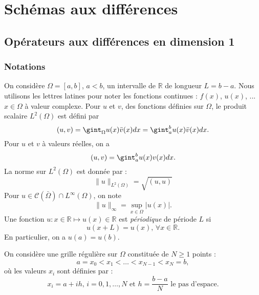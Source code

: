 \chapter{Schémas aux différences}

\section{Opérateurs aux différences en dimension 1}

\subsection{Notations}
\label{sec:notation_1D}

On considère $\Omega = [a,b]$, $a<b$, un intervalle de $\mathbb{R}$ de longueur $L=b-a$. Nous utilisons les lettres latines pour noter les fonctions continues : $f(x)$, $u(x)$, ... $x \in \Omega$ à valeur complexe. Pour $u$ et $v$, des fonctions définies sur $\Omega$, le produit scalaire $L^2 ( \Omega )$ est défini par
\begin{equation}
(u,v) = \gint_{\Omega} u(x) \bar{v}(x) dx = \gint_{a}^b u(x) \bar{v}(x) dx.
\end{equation}
Pour $u$ et $v$ à valeurs réelles, on a
\begin{equation}
(u,v) = \gint_{a}^b u(x) v(x) dx.
\end{equation}
La norme sur $L^2(\Omega)$ est donnée par :
\begin{equation}
\| u \|_{L^2(\Omega)} = \sqrt{(u,u)}
\end{equation}
Pour $u \in \mathcal
C(\bar{\Omega}) \cap L^{\infty}(\Omega)$, on note
\begin{equation}
\| u \|_{\infty} = \sup_{x\in\Omega} |u(x)|.
\end{equation}
Une fonction $u : x \in \mathbb{R} \mapsto u(x) \in \mathbb{R}$ est \textit{périodique} de période $L$ si 
\begin{equation}
u(x+L) = u(x) \text{, } \forall x \in \mathbb{R}.
\end{equation}
En particulier, on a $u(a)=u(b)$.

On considère une grille régulière sur $\Omega$ constituée de $N \geq 1$ points :
\begin{equation}
a=x_0 < x_1 < \ldots < x_{N-1} < x_N = b,
\end{equation}
où les valeurs $x_i$ sont définies par :
\begin{equation}
x_i = a + ih\text{, } i = 0,1, \ldots,N \text{ et } h = \dfrac{b-a}{N} \text{ le pas d'espace}. 
\end{equation}

